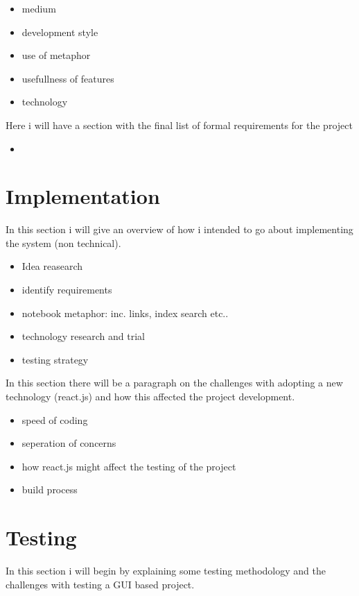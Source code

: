 \documentclass[a4paper, 11pt]{article}
\begin{document}
\begin{itemize}
  \item{medium}
  \item{development style}
  \item{use of metaphor}
  \item{usefullness of features}
  \item{technology}
\end{itemize}

Here i will have a section with the final list of formal requirements for the
project

\begin{itemize}
  \item{}
\end{itemize}

\section{Implementation}

In this section i will give an overview of how i intended to go about
implementing the system (non technical).

\begin{itemize}
  \item{Idea reasearch}
  \item{identify requirements}
  \item{notebook metaphor: inc. links, index search etc..}
  \item{technology research and trial}
  \item{testing strategy}
\end{itemize}

In this section there will be a paragraph on the challenges with adopting a new
technology (react.js) and how this affected the project development.

\begin{itemize}
  \item{speed of coding}
  \item{seperation of concerns}
  \item{how react.js might affect the testing of the project}
  \item{build process}
\end{itemize}

\section{Testing}

In this section i will begin by explaining some testing methodology and the
challenges with testing a GUI based project.
\end{document}
